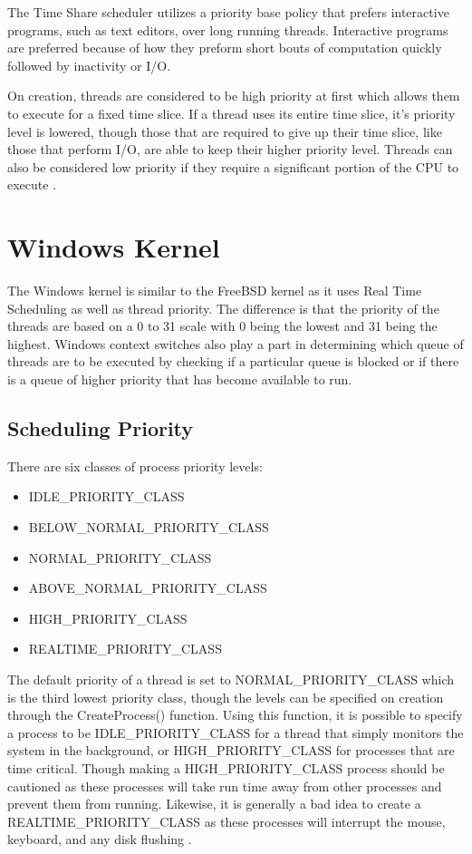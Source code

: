 \documentclass[10pt, draftclsnofoot,onecolumn]{IEEEtran}
\begin{document}
The Time Share scheduler utilizes a priority base policy that prefers interactive
programs, such as text editors, over long running threads. Interactive programs
are preferred because of how they preform short bouts of computation quickly
followed by inactivity or I/O. \par
On creation, threads are considered to be high priority at first which allows
them to execute for a fixed time slice. If a thread uses its entire time slice,
it's priority level is lowered, though those that are required to give up their
time slice, like those that perform I/O, are able to keep their higher priority
level. Threads can also be considered low priority if they require a significant
portion of the CPU to execute \cite{3}.

\section{Windows Kernel}

The Windows kernel is similar to the FreeBSD kernel as it uses Real Time Scheduling
as well as thread priority. The difference is that the priority of the threads are
based on a 0 to 31 scale with 0 being the lowest and 31 being the highest. Windows
context switches also play a part in determining which queue of threads are to be
executed by checking if a particular queue is blocked or if there is a queue of
higher priority that has become available to run.\par

\subsection{Scheduling Priority}

There are six classes of process priority levels:

\begin{itemize}
  \item IDLE\_PRIORITY\_CLASS
  \item BELOW\_NORMAL\_PRIORITY\_CLASS
  \item NORMAL\_PRIORITY\_CLASS
  \item ABOVE\_NORMAL\_PRIORITY\_CLASS
  \item HIGH\_PRIORITY\_CLASS
  \item REALTIME\_PRIORITY\_CLASS
\end{itemize}

The default priority of a thread is set to NORMAL\_PRIORITY\_CLASS which is the
third lowest priority class, though the levels can be specified on creation through
the CreateProcess() function. Using this function, it is possible to specify a
process to be IDLE\_PRIORITY\_CLASS for a thread that simply monitors the system
in the background, or HIGH\_PRIORITY\_CLASS for processes that are time critical.
Though making a HIGH\_PRIORITY\_CLASS process should be cautioned as these processes
will take run time away from other processes and prevent them from running.
Likewise, it is generally a bad idea to create a REALTIME\_PRIORITY\_CLASS as
these processes will interrupt the mouse, keyboard, and any disk flushing \cite{1}.
\end{document}
